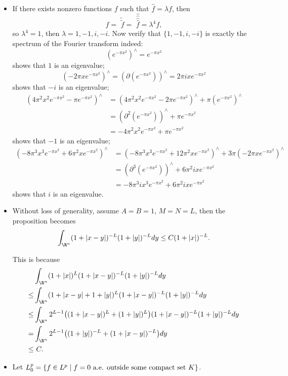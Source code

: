 \begin{itemize}
\item[2.2.3]

If there exists nonzero functions $f$ such that $\hat{f}=\lambda f$, then
$$f=\,\,\tilde{\!\!\tilde{f}}=\,\,\hat{\hat{\hat{\!\!\hat{f}}}}=\lambda^4 f,$$
so $\lambda^4=1$, then $\lambda=1,-1,i,-i$. 
Now verify that $\{1,-1,i,-i\}$ is exactly the spectrum of the Fourier transform indeed:
$$(e^{-\pi x^2})^\wedge=e^{-\pi x^2}$$
shows that $1$ is an eigenvalue;
$$(-2\pi xe^{-\pi x^2})^\wedge=(\partial(e^{-\pi x^2}))^\wedge=2\pi ixe^{-\pi x^2}$$
shows that $-i$ is an eigenvalue;
\begin{align*}
    (4\pi^2x^2e^{-\pi x^2}-\pi e^{-\pi x^2})^\wedge
    &=(4\pi^2x^2e^{-\pi x^2}-2\pi e^{-\pi x^2})^\wedge+\pi(e^{-\pi x^2})^\wedge\\
    &=(\partial^2(e^{-\pi x^2}))^\wedge+\pi e^{-\pi x^2}\\
    &=-4\pi^2x^2e^{-\pi x^2}+\pi e^{-\pi x^2}
\end{align*}
shows that $-1$ is an eigenvalue;
\begin{align*}
    (-8\pi^3x^3e^{-\pi x^2}+6\pi^2x e^{-\pi x^2})^\wedge
    &=(-8\pi^3x^3e^{-\pi x^2}+12\pi^2x e^{-\pi x^2})^\wedge+3\pi(-2\pi x e^{-\pi x^2})^\wedge\\
    &=(\partial^3(e^{-\pi x^2}))^\wedge+6\pi^2ix e^{-\pi x^2}\\
    &=-8\pi^3ix^3e^{-\pi x^2}+6\pi^2ix e^{-\pi x^2}
\end{align*}
shows that $i$ is an eigenvalue.


\item[2.2.4]

Without loss of generality, assume $A=B=1$, $M=N=L$, then the proposition becomes
$$\int_{\R^n}(1+|x-y|)^{-L}(1+|y|)^{-L}dy\leq C(1+|x|)^{-L}.$$

This is because
\begin{align*}
    &\int_{\R^n}(1+|x|)^{L}(1+|x-y|)^{-L}(1+|y|)^{-L}dy\\
    \leq&\int_{\R^n}(1+|x-y|+1+|y|)^{L}(1+|x-y|)^{-L}(1+|y|)^{-L}dy\\
    \leq&\int_{\R^n}2^{L-1}\big((1+|x-y|)^{L}+(1+|y|)^{L}\big)(1+|x-y|)^{-L}(1+|y|)^{-L}dy\\
    =&\int_{\R^n}2^{L-1}\big((1+|y|)^{-L}+(1+|x-y|)^{-L}\big)dy\\
    \leq&\ C.
    \end{align*}

\item[2.2.5]

Let $L_0^p=\{f\in L^p\mid f=0\textup{ a.e. outside some compact set }K\}$.


\end{itemize}
